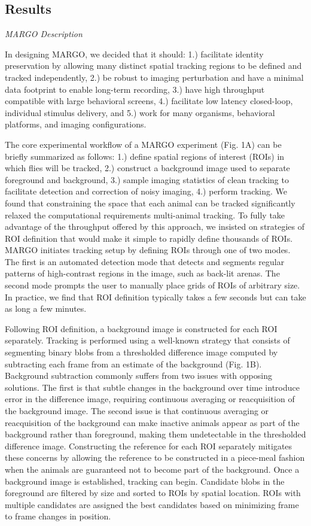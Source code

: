 \documentclass[10pt]{article}
\begin{document}
\begin{multicols}{2}
\section*{Results}

\textit{MARGO Description}

In designing MARGO, we decided that it should: 1.) facilitate identity preservation by allowing many distinct spatial tracking regions to be defined and tracked independently, 2.) be robust to imaging perturbation and have a minimal data footprint to enable long-term recording, 3.) have high throughput compatible with large behavioral screens, 4.) facilitate low latency closed-loop, individual stimulus delivery, and 5.) work for many organisms, behavioral platforms, and imaging configurations.

The core experimental workflow of a MARGO experiment (Fig. 1A) can be briefly summarized as follows: 1.) define spatial regions of interest (ROIs) in which flies will be tracked, 2.) construct a background image used to separate foreground and background, 3.) sample imaging statistics of clean tracking to facilitate detection and correction of noisy imaging, 4.) perform tracking.  We found that constraining the space that each animal can be tracked significantly relaxed the computational requirements multi-animal tracking. To fully take advantage of the throughput offered by this approach, we insisted on strategies of ROI definition that would make it simple to rapidly define thousands of ROIs. MARGO initiates tracking setup by defining ROIs through one of two modes. The first is an automated detection mode that detects and segments regular patterns of high-contrast regions in the image, such as back-lit arenas. The second mode prompts the user to manually place grids of ROIs of arbitrary size. In practice, we find that ROI definition typically takes a few seconds but can take as long a few minutes.

Following ROI definition, a background image is constructed for each ROI separately. Tracking is performed using a well-known strategy that consists of segmenting binary blobs from a thresholded difference image computed by subtracting each frame from an estimate of the background (Fig. 1B). Background subtraction commonly suffers from two issues with opposing solutions. The first is that subtle changes in the background over time introduce error in the difference image, requiring continuous averaging or reacquisition of the background image. The second issue is that continuous averaging or reacquisition of the background can make inactive animals appear as part of the background rather than foreground, making them undetectable in the thresholded difference image. Constructing the reference for each ROI separately mitigates these concerns by allowing the reference to be constructed in a piece-meal fashion when the animals are guaranteed not to become part of the background. Once a background image is established, tracking can begin. Candidate blobs in the foreground are filtered by size and sorted to ROIs by spatial location. ROIs with multiple candidates are assigned the best candidates based on minimizing frame to frame changes in position.


\end{multicols}
\end{document}
